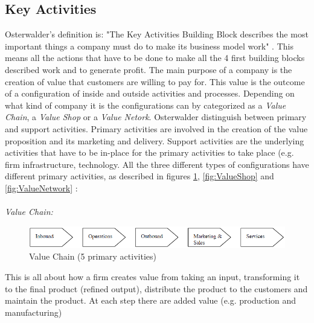 \subsection{Key Activities}
Osterwalder’s definition is: "The Key Activities Building Block describes the most important things a company must do to make its business model work" \cite{osterwalder}. This means all the actions that have to be done to make all the 4 first building blocks described work and to generate profit. The main purpose of a company is the creation of value that customers are willing to pay for. This value is the outcome of a configuration of inside and outside activities and processes. Depending on what kind of company it is the configurations can by categorized as a \emph{Value Chain}, a \emph{Value Shop} or a \emph{Value Netork}. Osterwalder distinguish between primary and support activities. Primary activities are involved in the creation of the value proposition and its marketing and delivery. Support activities are the underlying activities that have to be in-place for the primary activities to take place (e.g. firm infrastructure, technology. All the three different types of configurations have different primary activities, as described in  figures \ref{fig:ValueChain}, \ref{fig:ValueShop} and \ref{fig:ValueNetwork} \cite{osterwalderthesis}:\\ \\

\emph{Value Chain:} 

\begin{figure}[h]
\centering
\caption[ValueChain]{Value Chain (5 primary activities) \cite{osterwalderthesis}}
\label{fig:ValueChain}
\begin{center}
\includegraphics[scale=0.7]{valuechainnew}
\end{center}
\end{figure}
This is all about how a firm creates value from taking an input, transforming it to the final product (refined output), distribute the product  to the customers and maintain the product. At each step there are added value (e.g. production and manufacturing)

